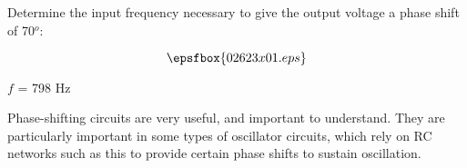 

Determine the input frequency necessary to give the output voltage a phase shift of 70$^{o}$:

$$\epsfbox{02623x01.eps}$$







$f$ = 798 Hz







Phase-shifting circuits are very useful, and important to understand.  They are particularly important in some types of oscillator circuits, which rely on RC networks such as this to provide certain phase shifts to sustain oscillation.




